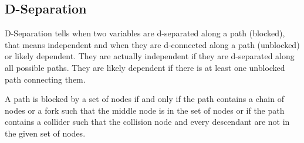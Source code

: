 \documentclass[a4paper,12pt]{article} %
\begin{document}
\subsection*{D-Separation}
D-Separation tells when two variables are d-separated along a path (blocked), that means independent and when they are d-connected along a path (unblocked) or likely dependent.
They are actually independent if they are d-separated along all possible paths.
They are likely dependent if there is at least one unblocked path connecting them.

A path is blocked by a set of nodes if and only if the path contains a chain of nodes or a fork such that the middle node is in the set of nodes or if the path contains a collider such that the collision node and every descendant are not in the given set of nodes. 
\end{document}
